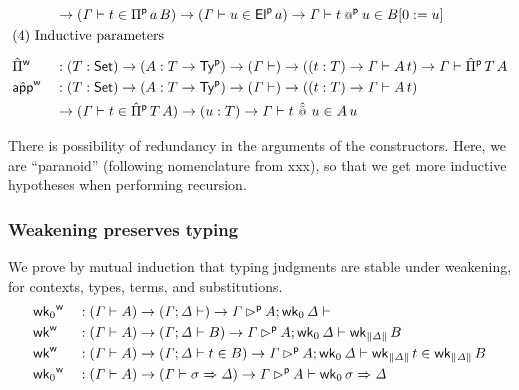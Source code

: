 \begin{definition}
\begin{alignat*}{5}
    & &&
    \ra(\GG \vdash t \in \Piu \, a \, B )
    \ra
    (\GG \vdash u \in \Elu\,a)
    \ra
    \GG \vdash t \appu u \in  B [0 := u] \\
  & \rlap{(4) Inductive parameters} \\[0.5em]
  & \Pimw && :
    (T:\Set)\ra(A : T\ra \Tyu)\ra(\GG \vdash)\ra
    ((t : T)\ra\GG\vdash A\,t) \ra
    \GG \vdash \Pimu \,T\,A
    \\
    & \appmw  && :
    (T:\Set)\ra(A : T\ra \Tyu)\ra(\GG \vdash)\ra
    ((t : T)\ra\GG\vdash A\,t)
    \\
    & &&
    \ra(\GG \vdash t \in \Pimu \,T\,A)
    \ra (u : T) \ra \GG \vdash t\,\appmu\,u \in A\,u
  \end{alignat*}
\end{definition}
There is possibility of redundancy in the arguments of the constructors. Here,
we are ``{paranoid}'' (following nomenclature from xxx), so that we get more inductive hypotheses when performing
recursion.


\subsubsection{Weakening preserves typing}
\label{lem:weaken-typing}
We prove by mutual induction that typing judgments are stable under weakening,
for contexts, types, terms, and substitutions.
\begin{alignat*}{5}
  & {\mathsf{wk}_0}^{\mathsf{w}} && : (\mathit{\Gamma} \vdash A)\rightarrow(\mathit{\Gamma} ; \mathit{\Delta}\vdash) \rightarrow
  \mathit{\Gamma} \mathbin{{\rhd}^{\mathsf{p}}} A ; \mathsf{wk}_0\, \mathit{\Delta} \vdash \\
  & {\mathsf{wk}}^{\mathsf{w}} && : (\mathit{\Gamma} \vdash A)\rightarrow(\mathit{\Gamma} ; \mathit{\Delta}\vdash B) \rightarrow
  \mathit{\Gamma} \mathbin{{\rhd}^{\mathsf{p}}} A ; \mathsf{wk}_0\,\mathit{\Delta} \vdash \mathsf{wk}_{\| \mathit{\Delta} \|}\, B  \\
  & {\mathsf{wk}}^{\mathsf{w}} && : (\mathit{\Gamma} \vdash A)\rightarrow(\mathit{\Gamma} ; \mathit{\Delta}\vdash t\in B) \rightarrow
  \mathit{\Gamma} \mathbin{{\rhd}^{\mathsf{p}}} A ; \mathsf{wk}_0\,\mathit{\Delta} \vdash \mathsf{wk}_{\| \mathit{\Delta} \|}\, t \in \mathsf{wk}_{\| \mathit{\Delta} \|}\,B  \\
  & {\mathsf{wk}_0}^{\mathsf{w}} && : (\mathit{\Gamma} \vdash A)\rightarrow(\mathit{\Gamma} \vdash \sigma
  \Rightarrow \mathit{\Delta}) \rightarrow
  \mathit{\Gamma} \mathbin{{\rhd}^{\mathsf{p}}} A \vdash \mathsf{wk}_0\, \sigma \Rightarrow \mathit{\Delta}
  \end{alignat*}

